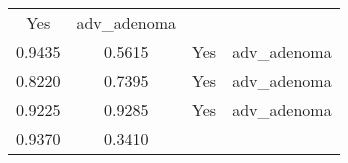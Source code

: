 \documentclass[12pt,]{article}
\begin{document}
\begin{longtable}[]{@{}cccc@{}}
\begin{minipage}[t]{0.22\columnwidth}
Yes\strut
\end{minipage} & \begin{minipage}[t]{0.16\columnwidth}\centering\strut
adv\_adenoma\strut
\end{minipage}\tabularnewline
\begin{minipage}[t]{0.24\columnwidth}\centering\strut
0.9435\strut
\end{minipage} & \begin{minipage}[t]{0.26\columnwidth}\centering\strut
0.5615\strut
\end{minipage} & \begin{minipage}[t]{0.22\columnwidth}\centering\strut
Yes\strut
\end{minipage} & \begin{minipage}[t]{0.16\columnwidth}\centering\strut
adv\_adenoma\strut
\end{minipage}\tabularnewline
\begin{minipage}[t]{0.24\columnwidth}\centering\strut
0.8220\strut
\end{minipage} & \begin{minipage}[t]{0.26\columnwidth}\centering\strut
0.7395\strut
\end{minipage} & \begin{minipage}[t]{0.22\columnwidth}\centering\strut
Yes\strut
\end{minipage} & \begin{minipage}[t]{0.16\columnwidth}\centering\strut
adv\_adenoma\strut
\end{minipage}\tabularnewline
\begin{minipage}[t]{0.24\columnwidth}\centering\strut
0.9225\strut
\end{minipage} & \begin{minipage}[t]{0.26\columnwidth}\centering\strut
0.9285\strut
\end{minipage} & \begin{minipage}[t]{0.22\columnwidth}\centering\strut
Yes\strut
\end{minipage} & \begin{minipage}[t]{0.16\columnwidth}\centering\strut
adv\_adenoma\strut
\end{minipage}\tabularnewline
\begin{minipage}[t]{0.24\columnwidth}\centering\strut
0.9370\strut
\end{minipage} & \begin{minipage}[t]{0.26\columnwidth}\centering\strut
0.3410\strut
\end{minipage} & \begin{minipage}[t]{0.22\columnwidth}\centering\strut

\end{minipage}
\end{longtable}
\end{document}
